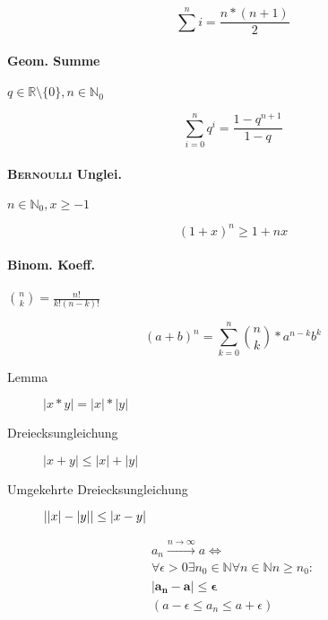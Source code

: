 \documentclass[uniLeipzig]{merkzettel}
\begin{document}
\begin{mzImportant}
  $$\sum^n i = \frac{n * (n + 1)}{2}$$
\end{mzImportant}

\begin{mzImportant}

  \paragraph{Geom. Summe} $q \in \mathbb{R} \setminus \{ 0 \}, n \in \mathbb{N}_0$

  $$\sum_{i=0}^n q^i = \frac{1 - q^{n+1}}{1 - q}$$

  \paragraph{\textsc{Bernoulli} Unglei.} $n \in \mathbb{N}_0, x \geq -1$

  $$(1 + x)^n \geq 1 + nx$$

  \paragraph{Binom. Koeff.} $\binom{n}{k} = \frac{n!}{k! (n - k)!}$
\end{mzImportant}

\begin{mzImportant}
  $$(a + b)^n = \sum_{k=0}^n \binom{n}{k} * a^{n - k} b^k$$
\end{mzImportant}

\begin{mzImportant}
  \begin{description}
    \item [Lemma] $|x * y| = |x| * |y|$

    \item [Dreiecksungleichung]
          $|x + y| \boldsymbol{\leq} |x| + |y|$

    \item [Umgekehrte \linebreak Dreiecksungleichung]
          $\linebreak ||x| - |y|| \leq |x - y|$
  \end{description}
\end{mzImportant}

\begin{mzImportant}
  \begin{gather*}
    a_n \xrightarrow{n \rightarrow \infty} a \Leftrightarrow \\
    \forall \epsilon > 0 \exists n_0 \in \mathbb{N} \forall n \in \mathbb{N} n \geq n_0: \\
    \mathbf{|a_n - a| \leq \epsilon} \\
    (a - \epsilon \leq a_n \leq a + \epsilon)
  \end{gather*}
\end{mzImportant}
\end{document}

